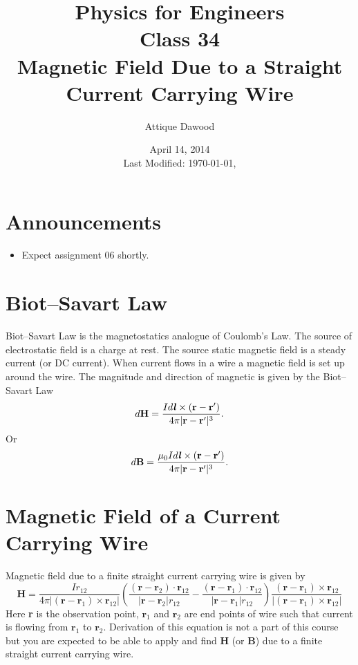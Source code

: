 \documentclass[12pt,a4paper]{article}
\title{\vspace{-3cm}Physics for Engineers\\Class 34\\Magnetic Field Due to a Straight Current Carrying Wire}
\author{Attique Dawood}
\date{April 14, 2014\\[0.2cm] Last Modified: \today, \currenttime}
\begin{document}
\maketitle
\section{Announcements}
\begin{itemize}
\item Expect assignment 06 shortly.
\end{itemize}
\section{Biot--Savart Law}
Biot--Savart Law is the magnetostatics analogue of Coulomb's Law. The source of electrostatic field is a charge at rest. The source static magnetic field is a steady current (or DC current). When current flows in a wire a magnetic field is set up around the wire. The magnitude and direction of magnetic is given by the Biot--Savart Law
\begin{equation}
d\textbf{H}=\dfrac{Id\textbf{\textit{l}}\times(\textbf{r}-\textbf{r}')}{4\pi|\textbf{r}-\textbf{r}'|^{3}}.
\end{equation}
Or
\begin{equation}
d\textbf{B}=\dfrac{\mu_0Id\textbf{\textit{l}}\times(\textbf{r}-\textbf{r}')}{4\pi|\textbf{r}-\textbf{r}'|^{3}}.
\end{equation}
\section{Magnetic Field of a Current Carrying Wire}
Magnetic field due to a finite straight current carrying wire is given by
\begin{equation}
\textbf{H}=\dfrac{Ir_{12}}{4\pi|(\textbf{r}-\textbf{r}_1)\times\textbf{r}_{12}|}\left(\dfrac{(\textbf{r}-\textbf{r}_2)\cdot\textbf{r}_{12}}{|\textbf{r}-\textbf{r}_2|r_{12}}-\dfrac{(\textbf{r}-\textbf{r}_1)\cdot\textbf{r}_{12}}{|\textbf{r}-\textbf{r}_1|r_{12}}\right)\dfrac{(\textbf{r}-\textbf{r}_1)\times\textbf{r}_{12}}{|(\textbf{r}-\textbf{r}_1)\times \textbf{r}_{12}|}
\end{equation}
Here \textbf{r} is the observation point, $\textbf{r}_1$ and $\textbf{r}_2$ are end points of wire such that current is flowing from $\textbf{r}_1$ to $\textbf{r}_2$. Derivation of this equation is not a part of this course but you are expected to be able to apply and find \textbf{H} (or \textbf{B}) due to a finite straight current carrying wire.
\newpage
\end{document}
